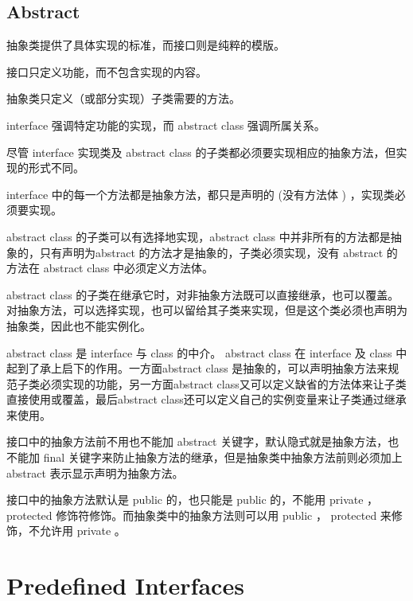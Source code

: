 \section{Abstract}

抽象类提供了具体实现的标准，而接口则是纯粹的模版。

\begin{compactitem}
\item 接口只定义功能，而不包含实现的内容。
\item 抽象类只定义（或部分实现）子类需要的方法。
\end{compactitem}

interface 强调特定功能的实现，而 abstract class 强调所属关系。

尽管 interface 实现类及 abstract class 的子类都必须要实现相应的抽象方法，但实现的形式不同。

\begin{compactitem}
\item interface 中的每一个方法都是抽象方法，都只是声明的 (没有方法体 ) ，实现类必须要实现。
\item abstract class 的子类可以有选择地实现，abstract class 中并非所有的方法都是抽象的，只有声明为abstract 的方法才是抽象的，子类必须实现，没有 abstract 的方法在 abstract class 中必须定义方法体。
\item abstract class 的子类在继承它时，对非抽象方法既可以直接继承，也可以覆盖。对抽象方法，可以选择实现，也可以留给其子类来实现，但是这个类必须也声明为抽象类，因此也不能实例化。
\end{compactitem}

abstract class 是 interface 与 class 的中介。 abstract class 在 interface 及 class 中起到了承上启下的作用。一方面abstract class 是抽象的，可以声明抽象方法来规范子类必须实现的功能，另一方面abstract class又可以定义缺省的方法体来让子类直接使用或覆盖，最后abstract class还可以定义自己的实例变量来让子类通过继承来使用。

接口中的抽象方法前不用也不能加 abstract 关键字，默认隐式就是抽象方法，也不能加 final 关键字来防止抽象方法的继承，但是抽象类中抽象方法前则必须加上 abstract 表示显示声明为抽象方法。

接口中的抽象方法默认是 public 的，也只能是 public 的，不能用 private ， protected 修饰符修饰。而抽象类中的抽象方法则可以用 public ， protected 来修饰，不允许用 private 。





\chapter{Predefined Interfaces}



